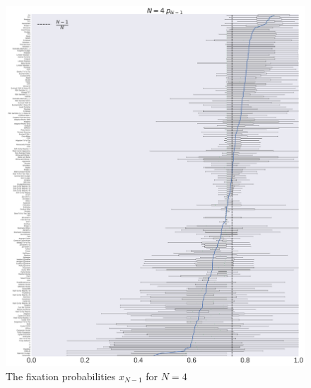 \documentclass[10pt,letterpaper]{article}
\begin{document}
\begin{figure}[!hbtp]
    \centering
    \includegraphics[width=\textwidth]{./boxplot_4_resist.pdf}
    \caption{The fixation probabilities \(x_{N-1}\) for \(N=4\)}
\end{figure}
\end{document}
